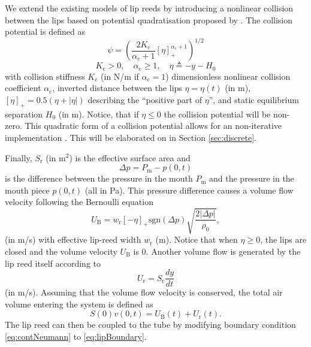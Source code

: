 We extend the existing models of lip reeds \cite{} by introducing a nonlinear collision between the lips based on potential quadratisation proposed by \cite{Ducceschi2021}. The collision potential is defined as
\begin{equation}
    \psi = \left(\frac{2K_\text{c}}{\alpha_\text{c}+1}[\eta]_+^{\alpha_\text{c}+1}
    \right)^{1/2}
\end{equation}
\begin{equation*}
    K_\text{c}>0, \quad \alpha_\text{c}\geq 1, \quad \eta\triangleq -y-H_0
\end{equation*}
with collision stiffness $K_\text{c}$ (in N/m if $\alpha_\text{c} = 1$) dimensionless nonlinear collision coefficient $\alpha_\text{c}$, inverted distance between the lips $\eta = \eta(t)$ (in m), $[\eta]_+ = 0.5 (\eta + |\eta|)$ describing the ``positive part of $\eta$'',  and static equilibrium separation $H_0$ (in m). Notice, that if $\eta 
\leq 0$ the collision potential will be non-zero. This quadratic form of a collision potential allows for an non-iterative implementation \cite{Ducceschi2021}. This will be elaborated on in Section \ref{sec:discrete}.

Finally, $S_\text{r}$ (in m$^2$) is the effective surface area and 
\begin{equation}
    \Delta p = P_\text{m} - p(0,t)
\end{equation}
is the difference between the pressure in the mouth $P_\text{m}$ and the pressure in the mouth piece $p(0, t)$ (all in Pa). This pressure difference causes a volume flow velocity following the Bernoulli equation
\begin{equation}
    U_\text{B} = w_\text{r}[-\eta]_+\text{sgn}(\Delta p) \sqrt{\frac{2|\Delta p|}{\rho_0}},
\end{equation}
(in m/s) with effective lip-reed width $w_\text{r}$ (m). Notice that when $\eta \geq 0$, the lips are closed and the volume velocity $U_\text{B}$ is 0. Another volume flow is generated by the lip reed itself according to
\begin{equation}
    U_\text{r} = S_\text{r} \frac{dy}{dt}
\end{equation}
(in m/s).
Assuming that the volume flow velocity is conserved, the total air volume entering the system is defined as
\begin{equation}\label{eq:lipBoundary}
    S(0)v(0,t) = U_\text{B}(t) + U_\text{r}(t).
\end{equation}
The lip reed can then be coupled to the tube by modifying boundary condition \eqref{eq:contNeumann} to \eqref{eq:lipBoundary}.

